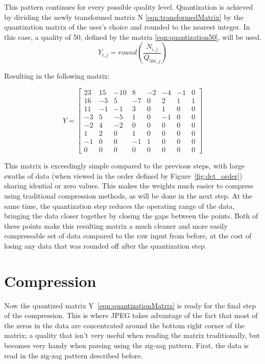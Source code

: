 \documentclass[11pt]{article}
\begin{document}
This pattern continues for every possible quality level.
Quantization is achieved by dividing the newly transformed matrix N \eqref{eqn:transformedMatrix} by the quantization matrix of the user's choice and rounded to the nearest integer.
In this case, a quality of 50, defined by the matrix \eqref{eqn:quantization50}, will be used.
\begin{equation}
  \label{eqn:quantization}
  Y_{i,j} = round\left( \frac{N_{i,j}}{Q_{50i,j}} \right)
\end{equation}

Resulting in the following matrix:

\begin{equation}
  \label{eqn:quantizationMatrix}
  Y = \begin{bmatrix}
    23 & 15 & -10 &  8 & -2 & -4 & -1 & 0 \\
    16 & -5 &   5 & -7 &  0 &  2 &  1 & 1 \\
    11 & -1 &  -1 &  3 &  0 &  1 &  0 & 0 \\
    -3 &  5 &  -5 &  1 &  0 & -1 &  0 & 0 \\
    -2 &  4 &  -2 &  0 &  0 &  0 &  0 & 0 \\
     1 &  2 &   0 &  1 &  0 &  0 &  0 & 0 \\
    -1 &  0 &   0 & -1 &  1 &  0 &  0 & 0 \\
     0 &  0 &   0 &  0 &  0 &  0 &  0 & 0 
  \end{bmatrix}
\end{equation}

This matrix is exceedingly simple compared to the previous steps, with large swaths of data (when viewed in the order defined by Figure~\ref{fig:dct_order}) sharing idential or zero values.
This makes the weights much easier to compress using traditional compression methods, as will be done in the next step.
At the same time, the quantization step reduces the operating range of the data, bringing the data closer together by closing the gaps between the points.
Both of these points make this resulting matrix a much cleaner and more easily compressable set of data compared to the raw input from before, at the cost of losing any data that was rounded off after the quantization step.

\section{Compression}
\label{sec: compression}

Now the quantized matrix Y~\eqref{eqn:quantizationMatrix} is ready for the final step of the compression.
This is where JPEG takes advantage of the fact that most of the zeros in the data are concentrated around the bottom right corner of the matrix; a quality that isn't very useful when reading the matrix traditionally, but becomes very handy when parsing using the zig-zag pattern.
First, the data is read in the zig-zag pattern described before.
\end{document}
